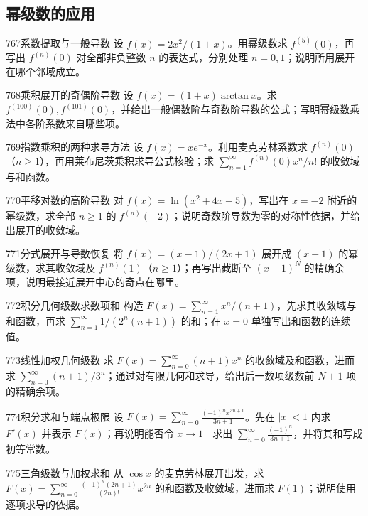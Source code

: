 \subsection{幂级数的应用}
\begin{exercise}{767}{系数提取与一般导数}
设 $f(x)=2x^2/(1+x)$。用幂级数求 $f^{(5)}(0)$，再写出 $f^{(n)}(0)$ 对全部非负整数 $n$ 的表达式，分别处理 $n=0,1$；说明所用展开在哪个邻域成立。
\end{exercise}
\begin{exercise}{768}{乘积展开的奇偶阶导数}
设 $f(x)=(1+x)\arctan x$。求 $f^{(100)}(0),f^{(101)}(0)$，并给出一般偶数阶与奇数阶导数的公式；写明幂级数乘法中各阶系数来自哪些项。
\end{exercise}
\begin{exercise}{769}{指数乘积的两种求导方法}
设 $f(x)=xe^{-x}$。利用麦克劳林系数求 $f^{(n)}(0)$（$n\ge1$），再用莱布尼茨乘积求导公式核验；求 $\sum_{n=1}^{\infty}f^{(n)}(0)x^n/n!$ 的收敛域与和函数。
\end{exercise}
\begin{exercise}{770}{平移对数的高阶导数}
对 $f(x)=\ln(x^2+4x+5)$，写出在 $x=-2$ 附近的幂级数，求全部 $n\ge1$ 的 $f^{(n)}(-2)$；说明奇数阶导数为零的对称性依据，并给出展开的收敛域。
\end{exercise}
\begin{exercise}{771}{分式展开与导数恢复}
将 $f(x)=(x-1)/(2x+1)$ 展开成 $(x-1)$ 的幂级数，求其收敛域及 $f^{(n)}(1)$（$n\ge1$）；再写出截断至 $(x-1)^N$ 的精确余项，说明最接近展开中心的奇点在哪里。
\end{exercise}
\begin{exercise}{772}{积分几何级数求数项和}
构造 $F(x)=\sum_{n=1}^{\infty}x^n/(n+1)$，先求其收敛域与和函数，再求 $\sum_{n=1}^{\infty}1/(2^n(n+1))$ 的和；在 $x=0$ 单独写出和函数的连续值。
\end{exercise}
\begin{exercise}{773}{线性加权几何级数}
求 $F(x)=\sum_{n=0}^{\infty}(n+1)x^n$ 的收敛域及和函数，进而求 $\sum_{n=0}^{\infty}(n+1)/3^n$；通过对有限几何和求导，给出后一数项级数前 $N+1$ 项的精确余项。
\end{exercise}
\begin{exercise}{774}{积分求和与端点极限}
设 $F(x)=\sum_{n=0}^{\infty}\frac{(-1)^n x^{3n+1}}{3n+1}$。先在 $|x|<1$ 内求 $F'(x)$ 并表示 $F(x)$；再说明能否令 $x\to1^-$ 求出 $\sum_{n=0}^{\infty}\frac{(-1)^n}{3n+1}$，并将其和写成初等常数。
\end{exercise}
\begin{exercise}{775}{三角级数与加权求和}
从 $\cos x$ 的麦克劳林展开出发，求 $F(x)=\sum_{n=0}^{\infty}\frac{(-1)^n(2n+1)}{(2n)!}x^{2n}$ 的和函数及收敛域，进而求 $F(1)$；说明使用逐项求导的依据。
\end{exercise}
